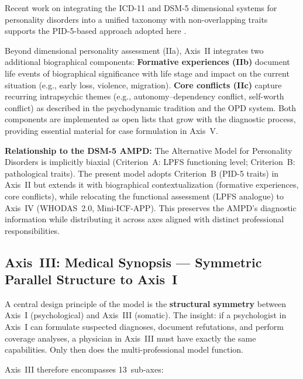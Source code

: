 \documentclass[11pt,a4paper]{article}
\begin{document}
Recent work on integrating the ICD-11 and DSM-5 dimensional systems for personality disorders into a unified taxonomy with non-overlapping traits supports the PID-5-based approach adopted here \citep{Bach2022}.

Beyond dimensional personality assessment (IIa), Axis~II integrates two additional biographical components: \textbf{Formative experiences (IIb)} document life events of biographical significance with life stage and impact on the current situation (e.g., early loss, violence, migration). \textbf{Core conflicts (IIc)} capture recurring intrapsychic themes (e.g., autonomy--dependency conflict, self-worth conflict) as described in the psychodynamic tradition and the OPD system. Both components are implemented as open lists that grow with the diagnostic process, providing essential material for case formulation in Axis~V.

\textbf{Relationship to the DSM-5 AMPD:} The Alternative Model for Personality Disorders is implicitly biaxial (Criterion~A: LPFS functioning level; Criterion~B: pathological traits). The present model adopts Criterion~B (PID-5 traits) in Axis~II but extends it with biographical contextualization (formative experiences, core conflicts), while relocating the functional assessment (LPFS analogue) to Axis~IV (WHODAS~2.0, Mini-ICF-APP). This preserves the AMPD's diagnostic information while distributing it across axes aligned with distinct professional responsibilities.

\subsection{Axis~III: Medical Synopsis --- Symmetric Parallel Structure to Axis~I}
\label{sec:axis3}

A central design principle of the model is the \textbf{structural symmetry} between Axis~I (psychological) and Axis~III (somatic). The insight: if a psychologist in Axis~I can formulate suspected diagnoses, document refutations, and perform coverage analyses, a physician in Axis~III must have exactly the same capabilities. Only then does the multi-professional model function.

Axis~III therefore encompasses 13~sub-axes:
\end{document}
